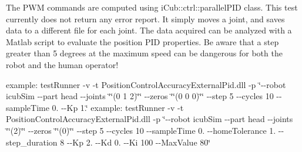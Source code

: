 The P\+WM commands are computed using i\+Cub\+::ctrl\+::parallel\+P\+ID class. This test currently does not return any error report. It simply moves a joint, and saves data to a different file for each joint. The data acquired can be analyzed with a Matlab script to evaluate the position P\+ID properties. Be aware that a step greater than 5 degrees at the maximum speed can be dangerous for both the robot and the human operator!

example\+: test\+Runner -\/v -\/t Position\+Control\+Accuracy\+External\+Pid.\+dll -\/p \char`\"{}-\/-\/robot icub\+Sim -\/-\/part head -\/-\/joints \char`\"{}\char`\"{}(0 1 2)\char`\"{}\char`\"{} -\/-\/zeros \char`\"{}\char`\"{}(0 0 0)\char`\"{}\char`\"{}  -\/-\/step 5  -\/-\/cycles 10 -\/-\/sample\+Time 0. -\/-\/\+Kp 1.\char`\"{} example\+: test\+Runner -\/v -\/t Position\+Control\+Accuracy\+External\+Pid.\+dll -\/p \char`\"{}-\/-\/robot icub\+Sim -\/-\/part head -\/-\/joints \char`\"{}\char`\"{}(2)\char`\"{}\char`\"{} -\/-\/zeros \char`\"{}\char`\"{}(0)\char`\"{}\char`\"{} -\/-\/step 5 -\/-\/cycles 10 -\/-\/sample\+Time 0. -\/-\/home\+Tolerance 1. -\/-\/step\+\_\+duration 8 -\/-\/\+Kp 2. -\/-\/\+Kd 0. -\/-\/\+Ki 100 -\/-\/\+Max\+Value 80\char`\"{}

